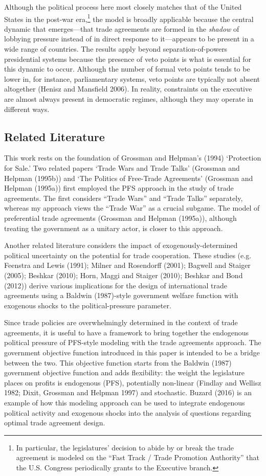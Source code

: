 \documentclass[10pt]{article}
\begin{document}
Although the political process here most closely matches that of the United States in the post-war era,\footnote{In particular, the legislatures' decision to abide by or break the trade agreement is modeled on the ``Fast Track / Trade Promotion Authority'' that the U.S. Congress periodically grants to the Executive branch.} the model is broadly applicable because the central dynamic that emerges---that trade agreements are formed in the \textit{shadow} of lobbying pressure instead of in direct response to it---appears to be present in a wide range of countries. The results apply beyond separation-of-powers presidential systems because the presence of veto points is what is essential for this dynamic to occur. Although the number of formal veto points tends to be lower in, for instance, parliamentary systems, veto points are typically not absent altogether (Henisz and Mansfield 2006). In reality, constraints on the executive are almost always present in democratic regimes, although they may operate in different ways.


\subsection{Related Literature}
This work rests on the foundation of Grossman and Helpman's (1994) `Protection for Sale.' Two related papers `Trade Wars and Trade Talks' (Grossman and Helpman (1995b)) and `The Politics of Free-Trade Agreements' (Grossman and Helpman (1995a)) first employed the PFS approach in the study of trade agreements. The first considers ``Trade Wars'' and ``Trade Talks'' separately, whereas my approach views the ``Trade War'' as a crucial subgame. The model of preferential trade agreements (Grossman and Helpman (1995a)), although treating the government as a unitary actor, is closer to this approach.

Another related literature considers the impact of exogenously-determined political uncertainty on the potential for trade cooperation. These studies (e.g. Feenstra and Lewis (1991); Milner and Rosendorff (2001); Bagwell and Staiger (2005); Beshkar (2010); Horn, Maggi and Staiger (2010); Beshkar and Bond (2012)) derive various implications for the design of international trade agreements using a Baldwin (1987)-style government welfare function with exogenous shocks to the political-pressure parameter. 

Since trade policies are overwhelmingly determined in the context of trade agreements, it is useful to have a framework to bring together the endogenous political pressure of PFS-style modeling with the trade agreements approach. The government objective function introduced in this paper is intended to be a bridge between the two. This objective function starts from the Baldwin (1987) government objective function and adds flexibility: the weight the legislature places on profits is endogenous (PFS), potentially non-linear (Findlay and Wellisz 1982; Dixit, Grossman and Helpman 1997) and stochastic. Buzard (2016) is an example of how this modeling approach can be used to integrate  endogenous political activity and exogenous shocks into the analysis of questions regarding optimal trade agreement design.
\end{document}
